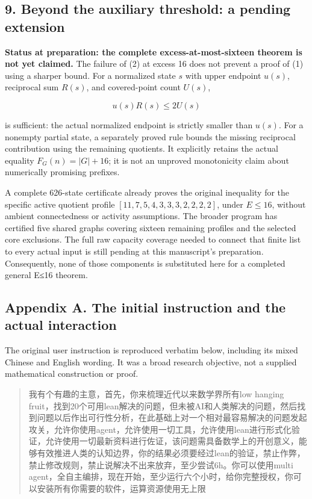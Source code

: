 \documentclass[
  11pt,
]{article}
\begin{document}
\hypertarget{beyond-the-auxiliary-threshold-a-pending-extension}{%
\subsection{9. Beyond the auxiliary threshold: a pending
extension}\label{beyond-the-auxiliary-threshold-a-pending-extension}}

\textbf{Status at preparation: the complete excess-at-most-sixteen
theorem is not yet claimed.} The failure of (2) at excess 16 does not
prevent a proof of (1) using a sharper bound. For a normalized state
\(s\) with upper endpoint \(u(s)\), reciprocal sum \(R(s)\), and
covered-point count \(U(s)\),

\[
u(s)R(s)\le2U(s)
\]

is sufficient: the actual normalized endpoint is strictly smaller than
\(u(s)\). For a nonempty partial state, a separately proved rule bounds
the missing reciprocal contribution using the remaining quotients. It
explicitly retains the actual equality \(F_G(n)=|G|+16\); it is not an
unproved monotonicity claim about numerically promising prefixes.

A complete 626-state certificate already proves the original inequality
for the specific active quotient profile \([11,7,5,4,3,3,3,2,2,2,2]\),
under \(E\le16\), without ambient connectedness or activity assumptions.
The broader program has certified five shared graphs covering sixteen
remaining profiles and the selected core exclusions. The full raw
capacity coverage needed to connect that finite list to every actual
input is still pending at this manuscript's preparation. Consequently,
none of those components is substituted here for a completed general
E≤16 theorem.

\hypertarget{appendix-a.-the-initial-instruction-and-the-actual-interaction}{%
\subsection{Appendix A. The initial instruction and the actual
interaction}\label{appendix-a.-the-initial-instruction-and-the-actual-interaction}}

The original user instruction is reproduced verbatim below, including
its mixed Chinese and English wording. It was a broad research
objective, not a supplied mathematical construction or proof.

\begin{quote}
我有个有趣的主意，首先，你来梳理近代以来数学界所有low hanging
fruit，找到20个可用lean解决的问题，但未被AI和人类解决的问题，然后找到问题以后作出可行性分析，在此基础上对一个相对最容易解决的问题发起攻关，允许你使用agent，允许使用一切工具，允许使用lean进行形式化验证，允许使用一切最新资料进行佐证，该问题需具备数学上的开创意义，能够有效推进人类的认知边界，你的结果必须要经过lean的验证，禁止作弊，禁止修改规则，禁止说解决不出来放弃，至少尝试6h。你可以使用multi
agent，全自主编排，现在开始，至少运行六个小时，给你完整授权，你可以安装所有你需要的软件，运算资源使用无上限
\end{quote}
\end{document}
